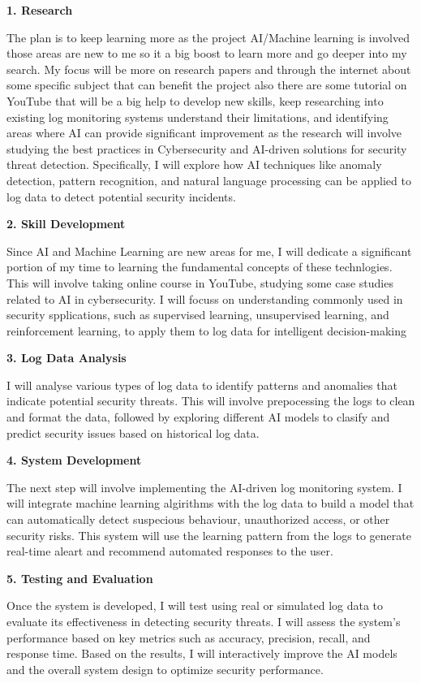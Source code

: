 \textbf{1. Research}

The plan is to keep learning more as the project AI/Machine learning is involved those areas are new to me so it a big boost to learn more and go deeper into my search. My focus will be more on research papers and through the internet about some specific subject that can benefit the project also there are some tutorial on YouTube that will be a big help to develop new skills, keep researching into existing log monitoring systems understand their limitations, and identifying areas where AI can provide significant improvement as the research will involve studying the best practices in Cybersecurity and AI-driven solutions for security threat detection. Specifically, I will explore how AI techniques like anomaly detection, pattern recognition, and natural language processing can be applied to log data to detect potential security incidents.

\textbf{2. Skill Development}


Since AI and Machine Learning are new areas for me, I will dedicate a significant portion of my time to learning the fundamental concepts of these technlogies. This will involve taking online course in YouTube, studying some case studies related to AI in cybersecurity. I will focuss on understanding commonly used in security spplications, such as supervised learning, unsupervised learning, and reinforcement learning, to apply them to log data for intelligent decision-making 


\textbf{3. Log Data Analysis}

I will analyse various types of log data to identify patterns and anomalies that indicate potential security threats. This will involve prepocessing the logs to clean and format the data, followed by exploring different AI models to clasify and predict security issues based on historical log data.


\textbf{4. System Development}


The next step will involve implementing the AI-driven log monitoring system. I will integrate machine learning algirithms with the log data to build a model that can automatically detect suspecious behaviour, unauthorized access, or other security risks. This system will use the learning pattern from the logs to generate real-time aleart and recommend automated responses to the user.


\textbf{5. Testing and Evaluation}

Once the system is developed, I will test using real or simulated log data to evaluate its effectiveness in detecting security threats. I will assess the system's performance based on key metrics such as accuracy, precision, recall, and response time. Based on the results, I will interactively improve the AI models and the overall system design to optimize security performance.


